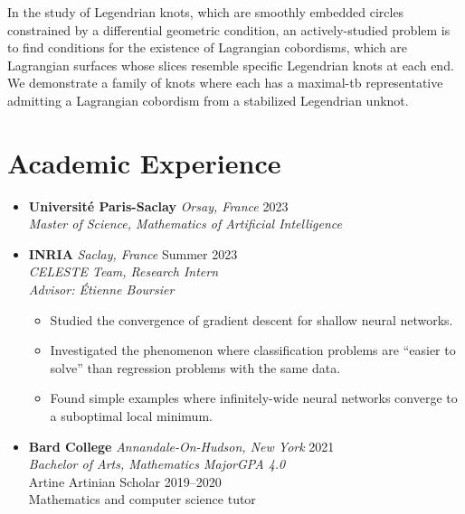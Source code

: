 \documentclass[12pt,letterpaper]{article}
\newenvironment{explist}
{\begin{itemize}[label=\textbf{--},itemsep=1pt,topsep=0pt,partopsep=0pt,parsep=0pt]}
{\end{itemize}}
\begin{document}
\begin{itemize}[label=]
        In the study of Legendrian knots, which are smoothly embedded circles constrained by a differential geometric condition,
        an actively-studied problem is to find conditions for the existence of Lagrangian cobordisms,
        which are Lagrangian surfaces whose slices resemble specific Legendrian knots at each end.
        We demonstrate a family of knots where each has a maximal-tb representative admitting a Lagrangian cobordism from a stabilized Legendrian unknot.

\end{itemize}

\section*{Academic Experience}
\begin{itemize}[label=]
    \item
        \textbf{Université Paris-Saclay} \textit{Orsay, France} \hfill 2023\\
        \textit{Master of Science, Mathematics of Artificial Intelligence}

    \item
        \textbf{INRIA} \textit{Saclay, France} \hfill Summer 2023\\
        \textit{CELESTE Team, Research Intern}\\
        \textit{Advisor: \'Etienne Boursier}
        \begin{explist}
        \item Studied the convergence of gradient descent for shallow neural networks.
        \item Investigated the phenomenon where classification problems are ``easier to solve'' than regression problems with the same data.
        \item Found simple examples where infinitely-wide neural networks converge to a suboptimal local minimum.
        \end{explist}

    \item
        \textbf{Bard College} \textit{Annandale-On-Hudson, New York} \hfill 2021\\
        \textit{Bachelor of Arts, Mathematics Major}\hfill \textit{GPA 4.0}\\
        Artine Artinian Scholar 2019--2020\\
        Mathematics and computer science tutor


\end{itemize}
\end{document}
